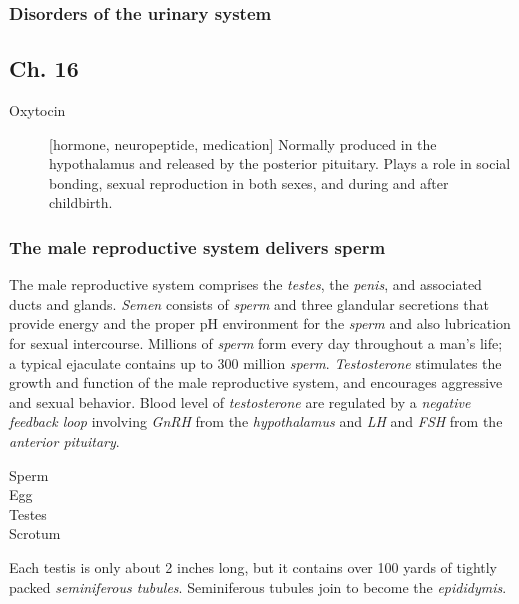\documentclass[11pt]{article}
\begin{document}
\subsubsection{Disorders of the urinary system}
\label{sec:orgbe9262b}
\subsection{Ch. 16}
\label{sec:org56de56c}
\begin{description}
\item[{Oxytocin}] [hormone, neuropeptide, medication] Normally produced in the
hypothalamus and released by the posterior pituitary. Plays a role in
social bonding, sexual reproduction in both sexes, and during and after
childbirth.
\end{description}

\subsubsection{The male reproductive system delivers sperm}
\label{sec:orgba2b3c5}
The male reproductive system comprises the \emph{testes}, the \emph{penis}, and associated
ducts and glands. \emph{Semen} consists of \emph{sperm} and three glandular secretions that
provide energy and the proper pH environment for the \emph{sperm} and also lubrication
for sexual intercourse. Millions of \emph{sperm} form every day throughout a man's
life; a typical ejaculate contains up to 300 million \emph{sperm}. \emph{Testosterone}
stimulates the growth and function of the male reproductive system, and
encourages aggressive and sexual behavior. Blood level of \emph{testosterone} are
regulated by a \emph{negative feedback loop} involving \emph{GnRH} from the \emph{hypothalamus} and
\emph{LH} and \emph{FSH} from the \emph{anterior pituitary}.

\begin{description}
\item[{Sperm}] 

\item[{Egg}] 

\item[{Testes}] 

\item[{Scrotum}] 
\end{description}


Each testis is only about 2 inches long, but it contains over 100 yards of
tightly packed \emph{seminiferous tubules}. Seminiferous tubules join to become the
\emph{epididymis}.
\end{document}
